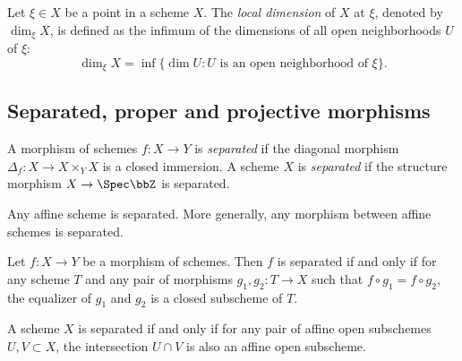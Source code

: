     \begin{definition}\label{def:local_dimension_of_schemes}
        Let \(\xi \in X\) be a point in a scheme \(X\).
        The \emph{local dimension} of \(X\) at \(\xi\), denoted by \(\dim_\xi X\), is defined as the infimum of the dimensions of all open neighborhoods \(U\) of \(\xi\):
        \[ \dim_\xi X = \inf \{\dim U : U \text{ is an open neighborhood of } \xi\}. \]
    \end{definition}

\subsection{Separated, proper and projective morphisms}

    \begin{definition}\label{def:separated_morphism_and_separated_scheme}
        A morphism of schemes \(f : X \to Y\) is \emph{separated} if the diagonal morphism \(\Delta_f : X \to X \times_Y X\) is a closed immersion.
        A scheme \(X\) is \emph{separated} if the structure morphism \(X \to \Spec \bbZ\) is separated.
    \end{definition}

    \begin{proposition}\label{prop:affine_scheme_is_separated}
        Any affine scheme is separated.
        More generally, any morphism between affine schemes is separated.
    \end{proposition}

    \begin{proposition}\label{prop:separatedness_and_rigidity_of_morphisms}
        Let \(f : X \to Y\) be a morphism of schemes.
        Then \(f\) is separated if and only if for any scheme \(T\) and any pair of morphisms \(g_1, g_2 : T \to X\) such that \(f \circ g_1 = f \circ g_2\),
        the equalizer of \(g_1\) and \(g_2\) is a closed subscheme of \(T\).
    \end{proposition}

    \begin{proposition}\label{prop:separatedness_and_intersection_of_affine_open_subschemes}
        A scheme \(X\) is separated if and only if for any pair of affine open subschemes \(U, V \subset X\), the intersection \(U \cap V\) is also an affine open subscheme.
    \end{proposition}

